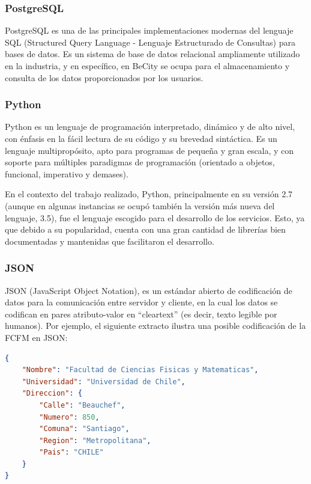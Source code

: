 \documentclass[11pt,letterpaper]{article}
\begin{document}

\subsubsection{PostgreSQL}

PostgreSQL\cite{postgres} es una de las principales implementaciones modernas del lenguaje SQL (Structured Query Language - Lenguaje Estructurado de Consultas) para bases de datos. Es un sistema de base de datos relacional ampliamente utilizado en la industria, y en específico, en BeCity se ocupa para el almacenamiento y consulta de los datos proporcionados por los usuarios.

\subsubsection{Python}

Python es un lenguaje de programación interpretado, dinámico y de alto nivel, con énfasis en la fácil lectura de su código y su brevedad sintáctica. Es un lenguaje multipropósito, apto para programas de pequeña y gran escala, y con soporte para múltiples paradigmas de programación (orientado a objetos, funcional, imperativo y demases).

En el contexto del trabajo realizado, Python, principalmente en su versión 2.7 (aunque en algunas instancias se ocupó también la versión más nueva del lenguaje, 3.5), fue el lenguaje escogido para el desarrollo de los servicios. Esto, ya que debido a su popularidad, cuenta con una gran cantidad de librerías bien documentadas y mantenidas que facilitaron el desarrollo.

\subsubsection{JSON}

JSON (JavaScript Object Notation), es un estándar abierto de codificación de datos para la comunicación entre servidor y cliente, en la cual los datos se codifican en pares atributo-valor en ``cleartext'' (es decir, texto legible por humanos).
Por ejemplo, el siguiente extracto ilustra una posible codificación de la FCFM en JSON:
\begin{lstlisting}[language=JSON]
{
    "Nombre": "Facultad de Ciencias Fisicas y Matematicas",
    "Universidad": "Universidad de Chile",
    "Direccion": {
        "Calle": "Beauchef",
        "Numero": 850,
        "Comuna": "Santiago",
        "Region": "Metropolitana",
        "Pais": "CHILE"
    }
}
\end{lstlisting}
\end{document}
